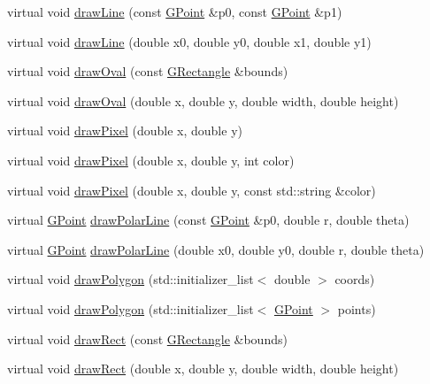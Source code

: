 \begin{DoxyCompactItemize}
\item 
virtual void \mbox{\hyperlink{classGDrawingSurface_ae6a24b6b9a6e795d3165c1c750d5bdf1}{draw\+Line}} (const \mbox{\hyperlink{classGPoint}{G\+Point}} \&p0, const \mbox{\hyperlink{classGPoint}{G\+Point}} \&p1)
\item 
virtual void \mbox{\hyperlink{classGDrawingSurface_aff299fe83178d2f3ce8c08c06b583484}{draw\+Line}} (double x0, double y0, double x1, double y1)
\item 
virtual void \mbox{\hyperlink{classGDrawingSurface_a8adc13027efe311b4a6a715205b8bc46}{draw\+Oval}} (const \mbox{\hyperlink{classGRectangle}{G\+Rectangle}} \&bounds)
\item 
virtual void \mbox{\hyperlink{classGDrawingSurface_aa5b1cf902e578907da3c63060686354e}{draw\+Oval}} (double x, double y, double width, double height)
\item 
virtual void \mbox{\hyperlink{classGDrawingSurface_a0c1e2923d8d163d62d0896d8c5cfa191}{draw\+Pixel}} (double x, double y)
\item 
virtual void \mbox{\hyperlink{classGDrawingSurface_a3a64eb6383e601be8438e9c71643c432}{draw\+Pixel}} (double x, double y, int color)
\item 
virtual void \mbox{\hyperlink{classGDrawingSurface_a20abc26a94b7eb310e34abf668e0f5f4}{draw\+Pixel}} (double x, double y, const std\+::string \&color)
\item 
virtual \mbox{\hyperlink{classGPoint}{G\+Point}} \mbox{\hyperlink{classGDrawingSurface_af70cce1e4f708f1ed5b6f29cecb660e7}{draw\+Polar\+Line}} (const \mbox{\hyperlink{classGPoint}{G\+Point}} \&p0, double r, double theta)
\item 
virtual \mbox{\hyperlink{classGPoint}{G\+Point}} \mbox{\hyperlink{classGDrawingSurface_ad3e646f90005295f2bbdf37d2bcb39d2}{draw\+Polar\+Line}} (double x0, double y0, double r, double theta)
\item 
virtual void \mbox{\hyperlink{classGDrawingSurface_afddec0a905108d8a8d6809a157f26776}{draw\+Polygon}} (std\+::initializer\+\_\+list$<$ double $>$ coords)
\item 
virtual void \mbox{\hyperlink{classGDrawingSurface_a021ee881e0d154dc4dd059698742889c}{draw\+Polygon}} (std\+::initializer\+\_\+list$<$ \mbox{\hyperlink{classGPoint}{G\+Point}} $>$ points)
\item 
virtual void \mbox{\hyperlink{classGDrawingSurface_a3dd4cc5891149dfc36746264f7289877}{draw\+Rect}} (const \mbox{\hyperlink{classGRectangle}{G\+Rectangle}} \&bounds)
\item 
virtual void \mbox{\hyperlink{classGDrawingSurface_a4148e770ffc5474153aadd4814dbd708}{draw\+Rect}} (double x, double y, double width, double height)

\end{DoxyCompactItemize}
